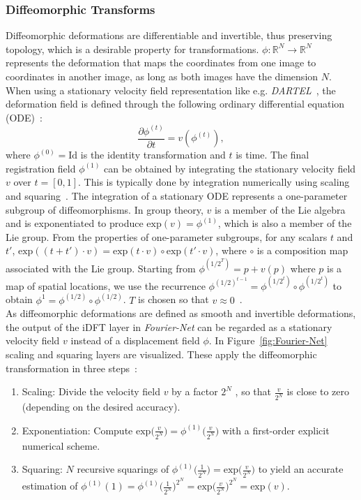 \documentclass[english,version-2022-01]{uzl-thesis} %
\begin{document}
\subsubsection{Diffeomorphic Transforms} \label{SubSubSec:DiffeomorphicTransforms}
Diffeomorphic deformations are differentiable and invertible, thus preserving topology, which is a desirable property for transformations. $\phi: \mathbb{R}^N \rightarrow \mathbb{R}^N$ represents the deformation that maps the coordinates from one image to coordinates in another image, as long as both images have the dimension $N$. When using a stationary velocity field representation like e.g. \emph{DARTEL}~\cite{DARTEL}, the deformation field is defined through the following ordinary differential equation (ODE)~\cite{Dalca2018}:
\begin{equation}
	\frac{\partial \phi^{(t)}}{\partial t} = v(\phi^{(t)}),
\end{equation}
where $\phi^{(0)} = \text{Id}$ is the identity transformation and $t$ is time. The final registration field $\phi^{(1)}$ can be obtained by integrating the stationary velocity field $v$ over $t = [0, 1]$. This is typically done by integration numerically using scaling and squaring~\cite{ScaleAndSquare}. The integration of a stationary ODE represents a one-parameter subgroup of diffeomorphisms. In group theory, $v$ is a member of the Lie algebra and is exponentiated to produce $\text{exp}(v) = \phi^{(1)}$, which is also a member of the Lie group. From the properties of one-parameter subgroups, for any scalars $t$ and $t'$, $\text{exp}((t + t') \cdot v) = \text{exp}(t \cdot v) \circ \text{exp}(t' \cdot v)$, where $\circ$ is a composition map associated with the Lie group. Starting from $\phi^{({1/2}^T)} = p + v(p)$ where $p$ is a map of spatial locations, we use the recurrence $\phi^{({1/2})^{t−1}} = \phi^{({1/2}^t)} \circ \phi^{({1/2}^t)}$ to obtain $\phi^1 = \phi^{(1/2)} \circ \phi^{(1/2)}$. $T$ is chosen so that $v \approx 0$~\cite{Dalca2018}. \\
As diffeomorphic deformations are defined as smooth and invertible deformations, the output of the iDFT layer in \emph{Fourier-Net} can be regarded as a stationary velocity field $v$ instead of a displacement field $\phi$. In Figure~\ref{fig:Fourier-Net} scaling and squaring layers are visualized. These apply the diffeomorphic transformation in three steps~\cite{ScaleAndSquare}:
\begin{enumerate}
	\item Scaling: Divide the velocity field $v$ by a factor $2^N$ , so that $\frac{v}{2^N}$ is close to zero (depending on the desired accuracy).
	\item Exponentiation: Compute $\text{exp}\big(\frac{v}{2^N}\big) = \phi^{(1)}\big(\frac{v}{2^N}\big)$ with a first-order explicit numerical scheme.
	\item Squaring: $N$ recursive squarings of $\phi^{(1)}\big(\frac{1}{2^N}\big) = \text{exp}\big(\frac{v}{2^N}\big)$ to yield an accurate estimation of $\phi^{(1)}(1) = \phi^{(1)}\big(\frac{1}{2^N}\big)^{2^N} = \text{exp}\big(\frac{v}{2^N}\big)^{2^N} = \text{exp}(v)$.
\end{enumerate}
\end{document}
